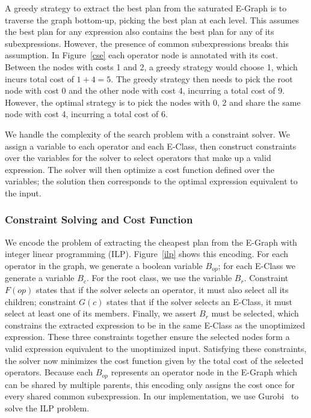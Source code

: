 A greedy strategy to extract the best plan from the saturated E-Graph is to
traverse the graph bottom-up, picking the best plan at each level. This assumes
the best plan for any expression also contains the best plan for any of its
subexpressions. However, the presence of common subexpressions breaks this
assumption. In Figure~\ref{cse} each operator node is annotated with its cost. 
Between the nodes with costs 1 and 2, a greedy strategy would choose 1, which
incurs total cost of $1+4=5$. The greedy strategy then needs to pick the root
node with cost 0 and the other node with cost 4, incurring a total cost of 9. 
However, the optimal strategy is to pick the nodes with 0, 2 and share the same
node with cost 4, incurring a total cost of 6. 

We handle the complexity of the search problem with a constraint
solver. We assign a variable to each operator and each E-Class, then construct
constraints over the variables for the solver to select operators that make up a
valid expression. The solver will then optimize a cost function defined over the
variables; the solution then corresponds to the optimal expression equivalent to
the input.

\subsubsection*{Constraint Solving and Cost Function}
We encode the problem of extracting the cheapest plan from the E-Graph with
integer linear programming (ILP). Figure~\ref{ilp} shows this encoding. For each
operator in the graph, we generate a boolean variable $B_{op}$; for each E-Class
we generate a variable $B_c$. For the root class, we use the variable $B_r$.
Constraint $F(op)$ states that if the solver selects an operator, it must also
select all its children; constraint $G(c)$ states that if the solver selects an
E-Class, it must select at least one of its members. Finally, we assert $B_r$ must 
be selected, which constrains the extracted expression
to be in the same E-Class as the unoptimized expression. These three constraints together
ensure the
selected nodes form a valid expression equivalent to the unoptimized input.
Satisfying these constraints, the solver now minimizes the cost function given
by the total cost of the selected operators. Because each $B_{op}$ represents an
operator node in the E-Graph which can be shared by multiple parents, this
encoding only assigns the cost once for every shared common subexpression. In
our implementation, we use Gurobi~\cite{gurobi} to solve the ILP problem.


